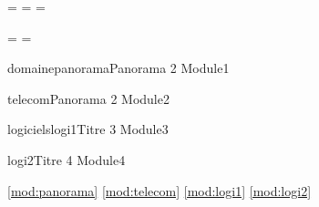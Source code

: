 \documentclass{article}
\begin{document}
=\hbox{\tralics@interpret@rc{\URParis\URSophia}}
=\hbox{}
=\hbox{}

=\hbox{}
=\hbox{}
\begin{module}{domaine}{panorama}{Panorama 2} Module1\end{module}
\begin{module}{}{telecom}{Panorama 2} Module2\end{module}
\begin{module}{logiciels}{logi1}{Titre 3} Module3\end{module}
\begin{module}{}{logi2}{Titre 4}\label{section:foo} Module4\end{module}



\def\moduleref#1#2#3{\ref{mod:#3}}
\moduleref{}{}{panorama}
\moduleref{}{}{telecom}
\moduleref{}{}{logi1}
\moduleref{}{}{logi2}
\end{document}
